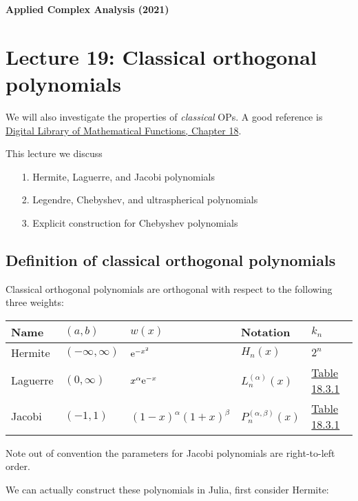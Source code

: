 \documentclass[12pt,a4paper]{article}
\def\E{ {\rm e} }
\begin{document}
\textbf{Applied Complex Analysis (2021)}

\section{Lecture 19: Classical orthogonal polynomials}
We will also investigate the properties of \emph{classical} OPs. A good reference is  \href{http://dlmf.nist.gov/18}{Digital Library of Mathematical Functions, Chapter 18}.

This lecture we discuss

\begin{itemize}
\item[1. ] Hermite, Laguerre, and Jacobi polynomials


\item[2. ] Legendre, Chebyshev, and ultraspherical polynomials


\item[3. ] Explicit construction for Chebyshev polynomials

\end{itemize}
\subsection{Definition of classical orthogonal polynomials}
Classical orthogonal polynomials are orthogonal with respect to the following three weights:

\begin{tabular}
{l | l | l | l | l}
Name & $(a,b)$ & $w(x)$ & Notation & $k_n$ \\
\hline
Hermite & $(-\infty,\infty)$ & $\E^{-x^2}$ & $H_n(x)$ & $2^n$ \\
Laguerre & $(0,\infty)$ & $x^\alpha \E^{-x}$ & $L_n^{(\alpha)}(x)$ & \href{http://dlmf.nist.gov/18.3}{Table 18.3.1} \\
Jacobi & $(-1,1)$ & $(1-x)^{\alpha} (1+x)^\beta$ & $P_n^{(\alpha,\beta)}(x)$ & \href{http://dlmf.nist.gov/18.3}{Table 18.3.1} \\
\end{tabular}
Note out of convention the parameters for Jacobi polynomials are right-to-left order.

We can actually construct these polynomials in Julia, first consider Hermite:
\end{document}
